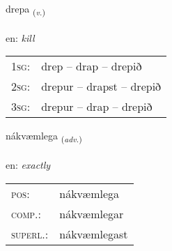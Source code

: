 \documentclass[frontgrid, backgrid]{flacards}\usepackage[]{graphicx}\usepackage[]{color}
\begin{document}
\renewcommand{\flhead}{\vskip5pt \fboxsep=0pt {\small\bfseries\footnotesize Sagnorð | Verb}}
\renewcommand{\fcfoot}{\vskip5pt \fboxsep=0pt \hspace{2pt}{\small\bfseries\footnotesize 2K}}

\renewcommand{\blhead}{\vskip5pt {\small\bfseries\footnotesize Sagnorð | Verb }}
\renewcommand{\bcfoot}{\vskip5pt \hspace{2pt}{\small\bfseries\footnotesize 2K}}


{drepa \small{\textsubscript{(\textit{v.})}} \\[1ex] %
\textphonetic{[trɛːpa]} \\
en: \emph{kill} \\  [2ex]
\renewcommand*{\arraystretch}{0.8}
\begin{tabular}{p{1cm}l}
\textsc{1sg}: & drep -- drap -- drepið \\ 
\textsc{2sg}: & drepur -- drapst -- drepið \\ 
\textsc{3sg}: & drepur -- drap -- drepið \\ 
\end{tabular}
}

\renewcommand{\flhead}{\vskip5pt \fboxsep=0pt {\small\bfseries\footnotesize Atviksorð | Adverb}}
\renewcommand{\fcfoot}{\vskip5pt \fboxsep=0pt \hspace{2pt}{\small\bfseries\footnotesize 2K}}

\renewcommand{\blhead}{\vskip5pt {\small\bfseries\footnotesize Atviksorð | Adverb }}
\renewcommand{\bcfoot}{\vskip5pt \hspace{2pt}{\small\bfseries\footnotesize 2K}}


{nákvæmlega \small{\textsubscript{(\textit{adv.})}} \\[1ex] %
\textphonetic{[nauːkʰvaimlɛɣa]} \\
en: \emph{exactly} \\  [2ex]
\renewcommand*{\arraystretch}{0.8}
\begin{tabular}{ll}
\textsc{pos}: & nákvæmlega \\ 
\textsc{comp.}: & nákvæmlegar \\ 
\textsc{superl.}: & nákvæmlegast \\
\end{tabular}
}
\end{document}
